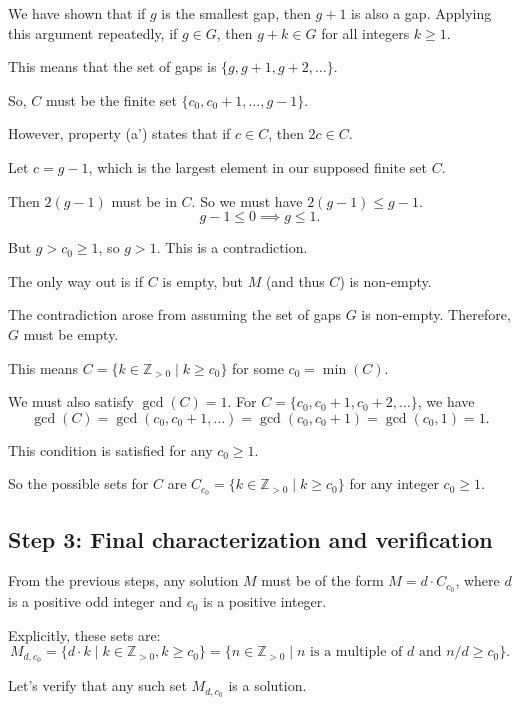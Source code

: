 \documentclass[12pt,a4paper]{article}
\theoremstyle{definition}
\begin{document}
        We have shown that if $g$ is the smallest gap, then $g+1$ is also a gap. Applying this argument repeatedly, if $g \in G$, then $g+k \in G$ for all integers $k \geq 1$.

        This means that the set of gaps is $\{g, g+1, g+2, \ldots\}$.

        So, $C$ must be the finite set $\{c_0, c_0+1, \ldots, g-1\}$.

        However, property (a') states that if $c \in C$, then $2c \in C$.

        Let $c = g-1$, which is the largest element in our supposed finite set $C$.

        Then $2(g-1)$ must be in $C$. So we must have $2(g-1) \leq g-1$.
        $$g-1 \leq 0 \implies g \leq 1.$$

        But $g > c_0 \geq 1$, so $g > 1$. This is a contradiction.

        The only way out is if $C$ is empty, but $M$ (and thus $C$) is non-empty.

        The contradiction arose from assuming the set of gaps $G$ is non-empty. Therefore, $G$ must be empty.

        This means $C = \{k \in \mathbb{Z}_{>0} \mid k \geq c_0\}$ for some $c_0 = \min(C)$.

        We must also satisfy $\gcd(C)=1$. For $C = \{c_0, c_0+1, c_0+2, \ldots\}$, we have
        $$\gcd(C) = \gcd(c_0, c_0+1, \ldots) = \gcd(c_0, c_0+1) = \gcd(c_0, 1) = 1.$$

        This condition is satisfied for any $c_0 \geq 1$.

        So the possible sets for $C$ are $C_{c_0} = \{k \in \mathbb{Z}_{>0} \mid k \geq c_0\}$ for any integer $c_0 \geq 1$.

        \subsection*{Step 3: Final characterization and verification}

        From the previous steps, any solution $M$ must be of the form $M = d \cdot C_{c_0}$, where $d$ is a positive odd integer and $c_0$ is a positive integer.

        Explicitly, these sets are:
        $$M_{d,c_0} = \{d \cdot k \mid k \in \mathbb{Z}_{>0}, k \geq c_0\} = \{n \in \mathbb{Z}_{>0} \mid n \text{ is a multiple of } d \text{ and } n/d \geq c_0\}.$$

        Let's verify that any such set $M_{d,c_0}$ is a solution.
\end{document}
